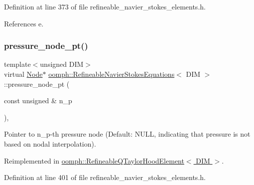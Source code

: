 Definition at line 373 of file refineable\+\_\+navier\+\_\+stokes\+\_\+elements.\+h.



References e.

\mbox{\label{classoomph_1_1RefineableNavierStokesEquations_acf35b4945a4b528f1b4eddfd6ca0c3d7}} 
\subsubsection{\texorpdfstring{pressure\+\_\+node\+\_\+pt()}{pressure\_node\_pt()}}
{\footnotesize\ttfamily template$<$unsigned D\+IM$>$ \\
virtual \hyperlink{classoomph_1_1Node}{Node}$\ast$ \hyperlink{classoomph_1_1RefineableNavierStokesEquations}{oomph\+::\+Refineable\+Navier\+Stokes\+Equations}$<$ D\+IM $>$\+::pressure\+\_\+node\+\_\+pt (\begin{DoxyParamCaption}\item[{const unsigned \&}]{n\+\_\+p }\end{DoxyParamCaption})\hspace{0.3cm}{\ttfamily [inline]}, {\ttfamily [virtual]}}



Pointer to n\+\_\+p-\/th pressure node (Default\+: N\+U\+LL, indicating that pressure is not based on nodal interpolation). 



Reimplemented in \hyperlink{classoomph_1_1RefineableQTaylorHoodElement_a03c79a396ff4d0bb7c8537fd92abb211}{oomph\+::\+Refineable\+Q\+Taylor\+Hood\+Element$<$ D\+I\+M $>$}.



Definition at line 401 of file refineable\+\_\+navier\+\_\+stokes\+\_\+elements.\+h.

\mbox{\label{classoomph_1_1RefineableNavierStokesEquations_a90e4eb90b7cf7dc11fdab8e10f973c69}} 
